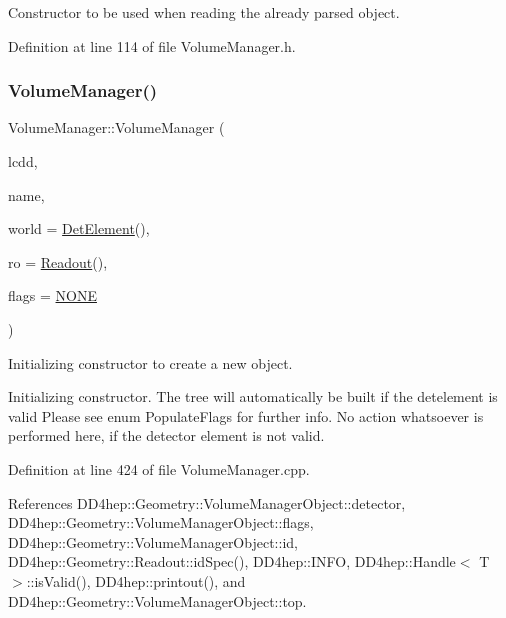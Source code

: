 Constructor to be used when reading the already parsed object. 



Definition at line 114 of file Volume\+Manager.\+h.

\hypertarget{class_d_d4hep_1_1_geometry_1_1_volume_manager_a3d11859d5bd8a89d64108af31afa4e1d}{}\label{class_d_d4hep_1_1_geometry_1_1_volume_manager_a3d11859d5bd8a89d64108af31afa4e1d} 
\subsubsection{\texorpdfstring{Volume\+Manager()}{VolumeManager()}\hspace{0.1cm}{\footnotesize\ttfamily [5/6]}}
{\footnotesize\ttfamily Volume\+Manager\+::\+Volume\+Manager (\begin{DoxyParamCaption}\item[{\hyperlink{class_d_d4hep_1_1_geometry_1_1_l_c_d_d}{L\+C\+DD} \&}]{lcdd,  }\item[{const std\+::string \&}]{name,  }\item[{\hyperlink{class_d_d4hep_1_1_geometry_1_1_det_element}{Det\+Element}}]{world = {\ttfamily \hyperlink{class_d_d4hep_1_1_geometry_1_1_det_element}{Det\+Element}()},  }\item[{\hyperlink{class_d_d4hep_1_1_geometry_1_1_readout}{Readout}}]{ro = {\ttfamily \hyperlink{class_d_d4hep_1_1_geometry_1_1_readout}{Readout}()},  }\item[{int}]{flags = {\ttfamily \hyperlink{class_d_d4hep_1_1_geometry_1_1_volume_manager_a1c25b37c1377654bf2fbe1cf4743ebdea8562837522298e9c40ab9cd35d9307ba}{N\+O\+NE}} }\end{DoxyParamCaption})}



Initializing constructor to create a new object. 

Initializing constructor. The tree will automatically be built if the detelement is valid Please see enum Populate\+Flags for further info. No action whatsoever is performed here, if the detector element is not valid. 

Definition at line 424 of file Volume\+Manager.\+cpp.



References D\+D4hep\+::\+Geometry\+::\+Volume\+Manager\+Object\+::detector, D\+D4hep\+::\+Geometry\+::\+Volume\+Manager\+Object\+::flags, D\+D4hep\+::\+Geometry\+::\+Volume\+Manager\+Object\+::id, D\+D4hep\+::\+Geometry\+::\+Readout\+::id\+Spec(), D\+D4hep\+::\+I\+N\+FO, D\+D4hep\+::\+Handle$<$ T $>$\+::is\+Valid(), D\+D4hep\+::printout(), and D\+D4hep\+::\+Geometry\+::\+Volume\+Manager\+Object\+::top.

